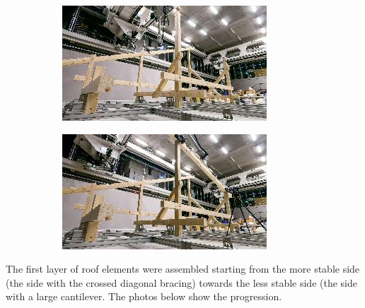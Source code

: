 \documentclass[11pt]{book}
\begin{document}
{\small \begin{figure}[H]
\centering
\begin{subfigure}[b]{0.45\textwidth}
\centering
\includegraphics[width=\textwidth]{./images/image71.jpeg}
\end{subfigure}
\hfill
\begin{subfigure}[b]{0.45\textwidth}
\centering
\includegraphics[width=\textwidth]{./images/image72.jpeg}
\end{subfigure}
\end{figure}
}

The first layer of roof elements were assembled starting from the more stable side (the side with the crossed diagonal bracing) towards the less stable side (the side with a large cantilever. The photos below show the progression.
\end{document}
